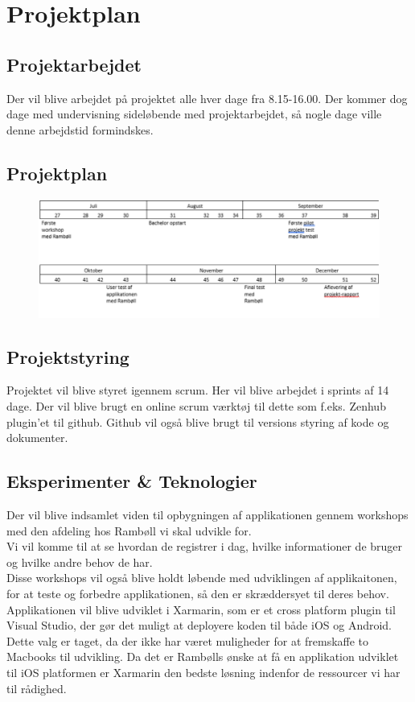 
	\chapter{Projektplan}
	
	\section{Projektarbejdet}
	Der vil blive arbejdet på projektet alle hver dage fra 8.15-16.00. Der kommer dog dage med undervisning sideløbende med projektarbejdet, så nogle dage ville denne arbejdstid formindskes. \\
	
	\section{Projektplan}
	\begin{figure}[h!]
		\centering
		\includegraphics[width=1\linewidth]{Projektplan/Projektplan}
	\end{figure}

	\section{Projektstyring}
	Projektet vil blive styret igennem scrum. Her vil blive arbejdet i sprints af 14 dage. Der vil blive brugt en online scrum værktøj til dette som f.eks. Zenhub plugin'et til github. Github vil også blive brugt til versions styring af kode og dokumenter. \\
	
	\section{Eksperimenter \& Teknologier}
	Der vil blive indsamlet viden til opbygningen af applikationen gennem workshops med den afdeling hos Rambøll vi skal udvikle for.\\
	Vi vil komme til at se hvordan de registrer i dag, hvilke informationer de bruger og hvilke andre behov de har.\\
	Disse workshops vil også blive holdt løbende med udviklingen af applikaitonen, for at teste og forbedre applikationen, så den er skræddersyet til deres behov. \\
	
	Applikationen vil blive udviklet i Xarmarin, som er et cross platform plugin til Visual Studio, der gør det muligt at deployere koden til både iOS og Android.\\
	Dette valg er taget, da der ikke har været muligheder for at fremskaffe to Macbooks til udvikling. Da det er Rambølls ønske at få en applikation udviklet til iOS platformen er Xarmarin den bedste løsning indenfor de ressourcer vi har til rådighed. 

